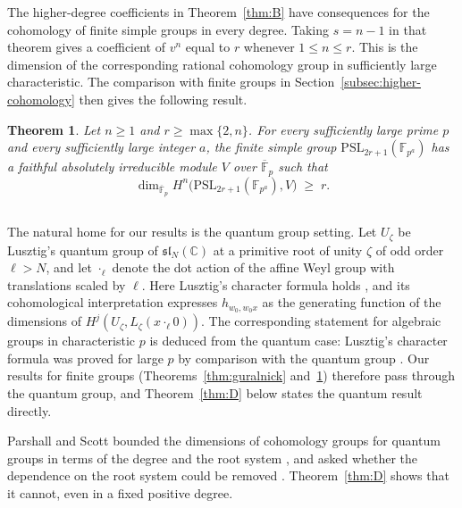 \documentclass[11pt,a4paper,reqno]{amsart}
\numberwithin{equation}{section}
\newtheorem{maintheorem}{Theorem}
\theoremstyle{definition}
\theoremstyle{remark}
\theoremstyle{plain}
\begin{document}
The higher-degree coefficients in Theorem~\ref{thm:B} have consequences
for the cohomology of finite simple groups in every degree. Taking
$s=n-1$ in that theorem gives a coefficient of $v^n$ equal to $r$ whenever $1\leq n\leq r$.
This is the dimension of the corresponding rational cohomology group
in sufficiently large characteristic. The comparison with finite groups
in Section~\ref{subsec:higher-cohomology} then gives the following result.

 
 
\begin{maintheorem}
\label{thm:C}
\label{thm:higher}
Let $n\ge1$ and $r\ge\max\{2,n\}$.
For every sufficiently large prime $p$ and every sufficiently large
integer $a$, the finite simple group
$\mathrm{PSL}_{2r+1}(\mathbb F_{p^a})$ has a faithful absolutely
irreducible module $V$ over $\overline{\mathbb F}_p$ such that
\[
\dim_{\overline{\mathbb F}_p}
H^n\big(\mathrm{PSL}_{2r+1}(\mathbb F_{p^a}),V\big)\;\ge\;r.
\]
\end{maintheorem}

 
 
\subsection{}  
 The natural home for our results is the quantum group setting. Let $U_\zeta$ be Lusztig's quantum group of $\mathfrak{sl}_N(\mathbb C)$ at a primitive root of unity $\zeta$ of odd order $\ell>N$, and let $\cdot_\ell$ denote the dot action of the affine Weyl group with translations scaled by $\ell$. Here Lusztig's character formula holds \cite{Tanisaki2004}, and its cohomological interpretation \cite{CPS-abstractKL,PS-BoundingExt} expresses $h_{w_0,w_0x}$ as the generating function of the dimensions of $H^j(U_\zeta,L_\zeta(x\cdot_\ell0))$. The corresponding statement for algebraic groups in characteristic $p$ is deduced from the quantum case: Lusztig's character formula was proved for large $p$ by comparison with the quantum group \cite{AJS}. Our results for finite groups (Theorems~\ref{thm:guralnick} and~\ref{thm:C}) therefore pass through the quantum group, and Theorem~\ref{thm:D} below states the quantum result directly.  


 
Parshall and Scott bounded the dimensions of cohomology groups for quantum groups in terms of the degree and the root system \cite[Corollary~6.7]{PS-BoundingExt}, and asked whether the dependence on the root system could be removed \cite[Remark~6.6]{PS-BoundingExt}. Theorem~\ref{thm:D} shows that it cannot, even in a fixed positive degree.
\end{document}
